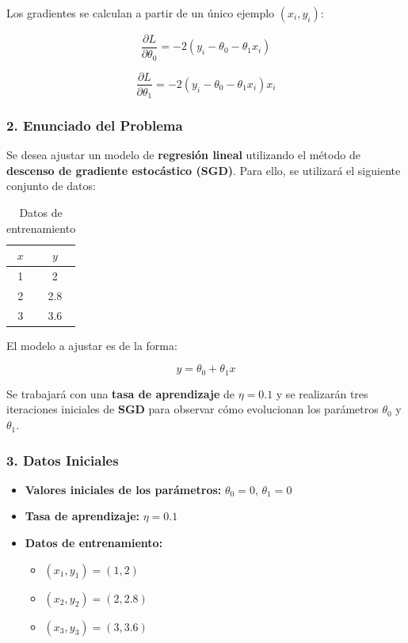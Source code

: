 \documentclass{article}
\begin{document}
Los gradientes se calculan a partir de un único ejemplo \( (x_i, y_i) \):

\[
\frac{\partial L}{\partial \theta_0} = -2 (y_i - \theta_0 - \theta_1 x_i)
\]

\[
\frac{\partial L}{\partial \theta_1} = -2 (y_i - \theta_0 - \theta_1 x_i) x_i
\]

\subsubsection*{2. Enunciado del Problema}

Se desea ajustar un modelo de \textbf{regresión lineal} utilizando el método de \textbf{descenso de gradiente estocástico (SGD)}. Para ello, se utilizará el siguiente conjunto de datos:

\begin{table}[h]
	\centering
	\begin{tabular}{|c|c|}
		\hline
		\( x \) & \( y \) \\
		\hline
		1 & 2 \\
		2 & 2.8 \\
		3 & 3.6 \\
		\hline
	\end{tabular}
	\caption{Datos de entrenamiento}
\end{table}

El modelo a ajustar es de la forma:

\[
y = \theta_0 + \theta_1 x
\]

Se trabajará con una \textbf{tasa de aprendizaje} de \( \eta = 0.1 \) y se realizarán tres iteraciones iniciales de \textbf{SGD} para observar cómo evolucionan los parámetros \( \theta_0 \) y \( \theta_1 \).

\subsubsection*{3. Datos Iniciales}

\begin{itemize}
	\item \textbf{Valores iniciales de los parámetros:} \( \theta_0 = 0 \), \( \theta_1 = 0 \)
	\item \textbf{Tasa de aprendizaje:} \( \eta = 0.1 \)
	\item \textbf{Datos de entrenamiento:}
	\begin{itemize}
		\item \( (x_1, y_1) = (1,2) \)
		\item \( (x_2, y_2) = (2,2.8) \)
		\item \( (x_3, y_3) = (3,3.6) \)
	\end{itemize}
\end{itemize}
\end{document}
